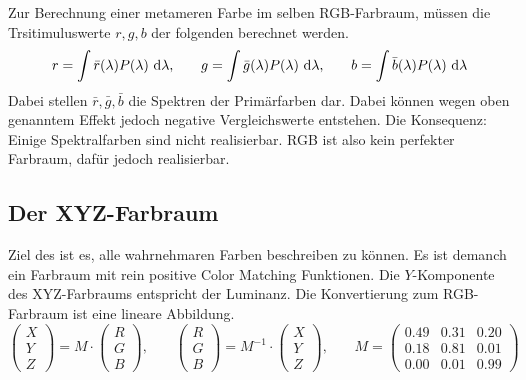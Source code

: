 Zur Berechnung einer metameren Farbe im selben RGB-Farbraum, müssen die Trsitimuluswerte $r, g, b$ der folgenden  berechnet werden.
\[
	r = \int \bar{r}(\lambda)P(\lambda) ~\mathrm{d} \lambda \text{,} \qquad
	g = \int \bar{g}(\lambda)P(\lambda) ~\mathrm{d} \lambda \text{,} \qquad
	b = \int \bar{b}(\lambda)P(\lambda) ~\mathrm{d} \lambda
\]
Dabei stellen $\bar{r}, \bar{g}, \bar{b}$ die Spektren der Primärfarben dar.
Dabei können wegen oben genanntem Effekt jedoch negative Vergleichswerte entstehen.
Die Konsequenz:
Einige Spektralfarben sind nicht realisierbar.
RGB ist also kein perfekter Farbraum, dafür jedoch realisierbar.

\subsection{Der XYZ-Farbraum}
Ziel des  ist es, alle wahrnehmaren Farben beschreiben zu können.
Es ist demanch ein Farbraum mit rein positive Color Matching Funktionen.
Die $Y$-Komponente des XYZ-Farbraums entspricht der Luminanz.
Die Konvertierung zum RGB-Farbraum ist eine lineare Abbildung.
\[
	\begin{pmatrix}
		X \\
		Y \\
		Z
	\end{pmatrix}
	= M \cdot
	\begin{pmatrix}
		R \\
		G \\
		B
	\end{pmatrix}
	\text{,} \qquad
	\begin{pmatrix}
		R \\
		G \\
		B
	\end{pmatrix}
	= M^{-1} \cdot
	\begin{pmatrix}
		X \\
		Y \\
		Z
	\end{pmatrix}
	\text{,} \qquad
	M =
	\begin{pmatrix}
		0.49 & 0.31 & 0.20 \\
		0.18 & 0.81 & 0.01 \\
		0.00 & 0.01 & 0.99
	\end{pmatrix}
\]

